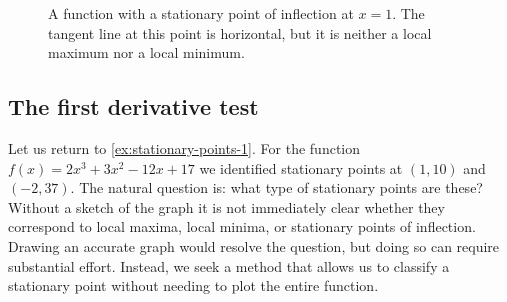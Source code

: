 \begin{figure}[htbp]
    \centering
    \caption{A function with a stationary point of inflection at \(x=1\). The tangent line at this point is horizontal, but it is neither a local maximum nor a local minimum.}
    \label{fig:stationary-inflection}
\end{figure}

\subsection*{The first derivative test}
Let us return to \autoref{ex:stationary-points-1}. For the function $f(x)=2 x^{3}+3 x^{2}-12 x+17$ we identified stationary points at $(1,10)$ and $(-2,37)$. The natural question is: what type of stationary points are these? Without a sketch of the graph it is not immediately clear whether they correspond to local maxima, local minima, or stationary points of inflection. Drawing an accurate graph would resolve the question, but doing so can require substantial effort. Instead, we seek a method that allows us to classify a stationary point without needing to plot the entire function.

